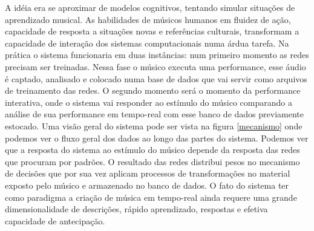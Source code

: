 \documentclass{ppgmus}
\begin{document}
A idéia era se aproximar de modelos cognitivos, tentando simular situações de aprendizado musical.
As habilidades de músicos humanos em fluidez de ação, capacidade de 
resposta a situações novas e referências culturais, transformam a capacidade de interação dos sistemas computacionais 
numa árdua tarefa. Na prática o sistema funcionaria em duas instâncias: num primeiro momento as redes precisam ser 
treinadas. Nessa fase o músico executa uma performance, esse áudio é captado, analisado e colocado numa base de dados 
que vai servir como arquivos de treinamento das redes. O segundo momento será o momento da performance interativa, 
onde o sistema vai responder ao estímulo do músico comparando a análise de sua performance em tempo-real com esse 
banco de dados previamente estocado. Uma visão geral do sistema pode ser vista na figura \ref{mecanismo} onde podemos ver o fluxo 
geral dos dados ao longo das partes do sistema. Podemos ver que a resposta do sistema ao estímulo do músico depende 
da resposta das redes que procuram por padrões. O resultado das redes distribui pesos no mecanismo de decisões que por 
sua vez aplicam processos de transformações no material exposto pelo músico e armazenado no banco de dados.
   O fato do sistema ter como paradigma a criação de música em tempo-real ainda requere uma grande dimensionalidade de 
descrições, rápido aprendizado, respostas e efetiva capacidade de antecipação. 
\end{document}

